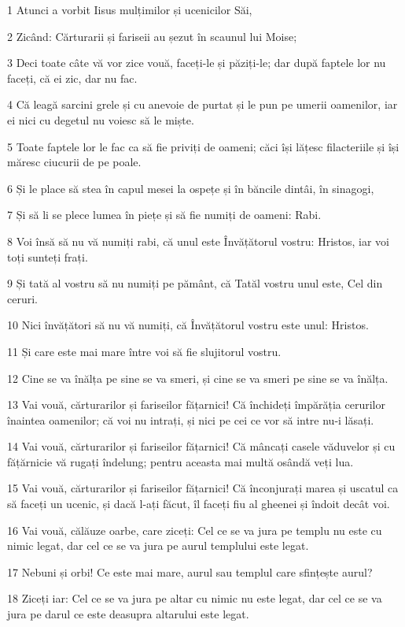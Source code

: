 \par 1 Atunci a vorbit Iisus mulțimilor și ucenicilor Săi,
\par 2 Zicând: Cărturarii și fariseii au șezut în scaunul lui Moise;
\par 3 Deci toate câte vă vor zice vouă, faceți-le și păziți-le; dar după faptele lor nu faceți, că ei zic, dar nu fac.
\par 4 Că leagă sarcini grele și cu anevoie de purtat și le pun pe umerii oamenilor, iar ei nici cu degetul nu voiesc să le miște.
\par 5 Toate faptele lor le fac ca să fie priviți de oameni; căci își lățesc filacteriile și își măresc ciucurii de pe poale.
\par 6 Și le place să stea în capul mesei la ospețe și în băncile dintâi, în sinagogi,
\par 7 Și să li se plece lumea în piețe și să fie numiți de oameni: Rabi.
\par 8 Voi însă să nu vă numiți rabi, că unul este Învățătorul vostru: Hristos, iar voi toți sunteți frați.
\par 9 Și tată al vostru să nu numiți pe pământ, că Tatăl vostru unul este, Cel din ceruri.
\par 10 Nici învățători să nu vă numiți, că Învățătorul vostru este unul: Hristos.
\par 11 Și care este mai mare între voi să fie slujitorul vostru.
\par 12 Cine se va înălța pe sine se va smeri, și cine se va smeri pe sine se va înălța.
\par 13 Vai vouă, cărturarilor și fariseilor fățarnici! Că închideți împărăția cerurilor înaintea oamenilor; că voi nu intrați, și nici pe cei ce vor să intre nu-i lăsați.
\par 14 Vai vouă, cărturarilor și fariseilor fățarnici! Că mâncați casele văduvelor și cu fățărnicie vă rugați îndelung; pentru aceasta mai multă osândă veți lua.
\par 15 Vai vouă, cărturarilor și fariseilor fățarnici! Că înconjurați marea și uscatul ca să faceți un ucenic, și dacă l-ați făcut, îl faceți fiu al gheenei și îndoit decât voi.
\par 16 Vai vouă, călăuze oarbe, care ziceți: Cel ce se va jura pe templu nu este cu nimic legat, dar cel ce se va jura pe aurul templului este legat.
\par 17 Nebuni și orbi! Ce este mai mare, aurul sau templul care sfințește aurul?
\par 18 Ziceți iar: Cel ce se va jura pe altar cu nimic nu este legat, dar cel ce se va jura pe darul ce este deasupra altarului este legat.
